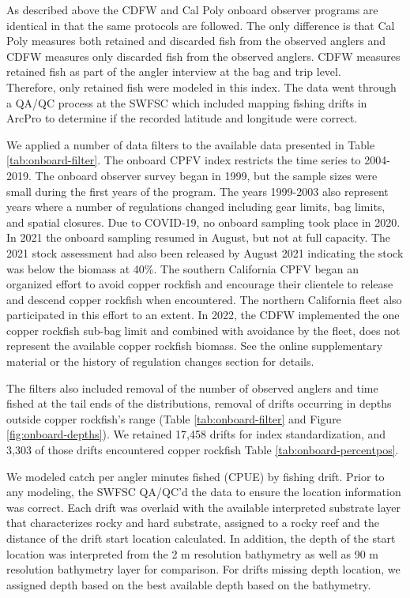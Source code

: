 \documentclass[11pt,
  english,
  letterpaper,
]{article}
\begin{document}
As described above the CDFW and Cal Poly onboard observer programs are identical in that the same protocols are followed. The only difference is that Cal Poly measures both retained and discarded fish from the observed anglers and CDFW measures only discarded fish from the observed anglers. CDFW measures retained fish as part of the angler interview at the bag and trip level.\\
Therefore, only retained fish were modeled in this index. The data went through a QA/QC process at the SWFSC which included mapping fishing drifts in ArcPro to determine if the recorded latitude and longitude were correct.

We applied a number of data filters to the available data presented in Table \ref{tab:onboard-filter}. The onboard CPFV index restricts the time series to 2004-2019. The onboard observer survey began in 1999, but the sample sizes were small during the first years of the program. The years 1999-2003 also represent years where a number of regulations changed including gear limits, bag limits, and spatial closures. Due to COVID-19, no onboard sampling took place in 2020. In 2021 the onboard sampling resumed in August, but not at full capacity. The 2021 stock assessment had also been released by August 2021 indicating the stock was below the biomass at 40\%. The southern California CPFV began an organized effort to avoid copper rockfish and encourage their clientele to release and descend copper rockfish when encountered. The northern California fleet also participated in this effort to an extent. In 2022, the CDFW implemented the one copper rockfish sub-bag limit and combined with avoidance by the fleet, does not represent the available copper rockfish biomass. See the online supplementary material or the history of regulation changes section for details.

The filters also included removal of the number of observed anglers and time fished at the tail ends of the distributions, removal of drifts occurring in depths outside copper rockfish's range (Table \ref{tab:onboard-filter} and Figure \ref{fig:onboard-depths}). We retained 17,458 drifts for index standardization, and 3,303 of those drifts encountered copper rockfish Table \ref{tab:onboard-percentpos}.

We modeled catch per angler minutes fished (CPUE) by fishing drift. Prior to any modeling, the SWFSC QA/QC'd the data to ensure the location information was correct. Each drift was overlaid with the available interpreted substrate layer that characterizes rocky and hard substrate, assigned to a rocky reef and the distance of the drift start location calculated. In addition, the depth of the start location was interpreted from the 2 m resolution bathymetry as well as 90 m resolution bathymetry layer for comparison. For drifts missing depth location, we assigned depth based on the best available depth based on the bathymetry.
\end{document}

